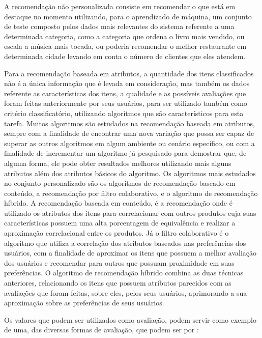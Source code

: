 \documentclass[12pt,
				openright,
				twoside,
				a4paper,
				apter=TITLE,
				section=TITLE,
				subsection=TITLE,
				chapter=TITLE,
				english,
				brazil]{abntex2}
\begin{document}
A recomendação não personalizada consiste em recomendar o que está em destaque no momento utilizando, para o aprendizado de máquina, um conjunto de teste composto pelos dados mais relevantes do sistema referente a uma determinada categoria, como a categoria que ordena o livro mais vendido, ou escala a música mais tocada, ou poderia recomendar o melhor restaurante em determinada cidade levando em conta o número de clientes que eles atendem.

Para a recomendação baseada em atributos, a quantidade dos itens classificados não é a única informação que é levada em consideração, mas também os dados referente as características dos itens, a qualidade e as possíveis avaliações que foram feitas anteriormente por seus usuários, para ser utilizado também como critério classificatório, utilizando algoritmos que são característicos para esta tarefa. Muitos algoritmos são estudados na recomendação baseada em atributos, sempre com a finalidade de encontrar uma nova variação que possa ser capaz de superar as outros algoritmos em algum ambiente ou cenário específico, ou com a finalidade de incrementar um algoritmo já pesquisado para demostrar que, de alguma forma, ele pode obter resultados melhores utilizando mais alguns atributos além dos atributos básicos do algoritmo. Os algoritmos mais estudados no conjunto personalizado são os algoritmos de recomendação baseado em conteúdo, a recomendação por filtro colaborativo, e o algoritmo de recomendação híbrido. A recomendação baseada em conteúdo, é a recomendação onde é utilizado os atributos dos itens para correlacionar com outros produtos cuja suas características possuem uma alta porcentagem de equivalência e realizar a aproximação correlacional entre os produtos. Já o filtro colaborativo é o algoritmo que utiliza a correlação dos atributos baseados nas preferências dos usuários, com a finalidade de aproximar os itens que possuem a melhor avaliação dos usuários e recomendar para outros que possuam proximidade em suas preferências. O algoritmo de recomendação híbrido combina as duas técnicas anteriores, relacionando os itens que possuem atributos parecidos com as avaliações que foram feitas, sobre eles, pelos seus usuários, aprimorando a sua aproximação sobre as preferências de seus usuários.

Os valores que podem ser utilizados como avaliação, podem servir como exemplo de uma, das diversas formas de avaliação, que podem ser por \cite{schafer2007collaborative}:
\end{document}
